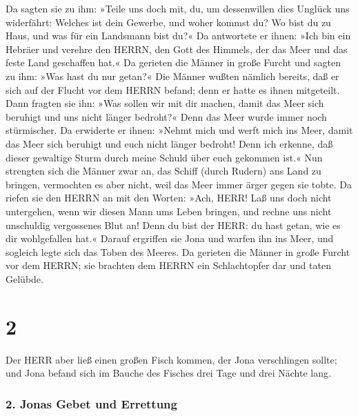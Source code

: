 Da sagten sie zu ihm: »Teile uns doch mit, du, um
dessenwillen dies Unglück uns widerfährt: Welches ist dein Gewerbe, und
woher kommst du? Wo bist du zu Haus, und was für ein Landsmann bist du?«
Da antwortete er ihnen: »Ich bin ein Hebräer und verehre
den HERRN, den Gott des Himmels, der das Meer und das feste Land
geschaffen hat.« Da gerieten die Männer in große Furcht
und sagten zu ihm: »Was hast du nur getan?« Die Männer wußten nämlich
bereits, daß er sich auf der Flucht vor dem HERRN befand; denn er hatte
es ihnen mitgeteilt. Dann fragten sie ihn: »Was sollen
wir mit dir machen, damit das Meer sich beruhigt und uns nicht länger
bedroht?« Denn das Meer wurde immer noch stürmischer. Da
erwiderte er ihnen: »Nehmt mich und werft mich ins Meer, damit das Meer
sich beruhigt und euch nicht länger bedroht! Denn ich erkenne, daß
dieser gewaltige Sturm durch meine Schuld über euch gekommen ist.«
Nun strengten sich die Männer zwar an, das Schiff (durch
Rudern) ans Land zu bringen, vermochten es aber nicht, weil das Meer
immer ärger gegen sie tobte. Da riefen sie den HERRN an
mit den Worten: »Ach, HERR! Laß uns doch nicht untergehen, wenn wir
diesen Mann ums Leben bringen, und rechne uns nicht unschuldig
vergossenes Blut an! Denn du bist der HERR: du hast getan, wie es dir
wohlgefallen hat.« Darauf ergriffen sie Jona und warfen
ihn ins Meer, und sogleich legte sich das Toben des Meeres.
Da gerieten die Männer in große Furcht vor dem HERRN; sie
brachten dem HERRN ein Schlachtopfer dar und taten Gelübde.

\hypertarget{section-1}{%
\section{2}\label{section-1}}

Der HERR aber ließ einen großen Fisch kommen, der Jona
verschlingen sollte; und Jona befand sich im Bauche des Fisches drei
Tage und drei Nächte lang.

\hypertarget{jonas-gebet-und-errettung}{%
\subsubsection{2. Jonas Gebet und
Errettung}\label{jonas-gebet-und-errettung}}

